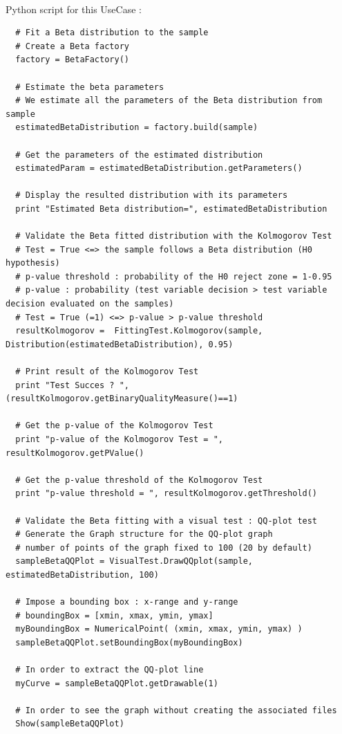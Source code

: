 \textspace\\
Python script for this UseCase :

\begin{lstlisting}
  # Fit a Beta distribution to the sample
  # Create a Beta factory
  factory = BetaFactory()

  # Estimate the beta parameters
  # We estimate all the parameters of the Beta distribution from sample
  estimatedBetaDistribution = factory.build(sample)

  # Get the parameters of the estimated distribution
  estimatedParam = estimatedBetaDistribution.getParameters()

  # Display the resulted distribution with its parameters
  print "Estimated Beta distribution=", estimatedBetaDistribution

  # Validate the Beta fitted distribution with the Kolmogorov Test
  # Test = True <=> the sample follows a Beta distribution (H0 hypothesis)
  # p-value threshold : probability of the H0 reject zone = 1-0.95
  # p-value : probability (test variable decision > test variable decision evaluated on the samples)
  # Test = True (=1) <=> p-value > p-value threshold
  resultKolmogorov =  FittingTest.Kolmogorov(sample, Distribution(estimatedBetaDistribution), 0.95)

  # Print result of the Kolmogorov Test
  print "Test Succes ? ", (resultKolmogorov.getBinaryQualityMeasure()==1)

  # Get the p-value of the Kolmogorov Test
  print "p-value of the Kolmogorov Test = ", resultKolmogorov.getPValue()

  # Get the p-value threshold of the Kolmogorov Test
  print "p-value threshold = ", resultKolmogorov.getThreshold()

  # Validate the Beta fitting with a visual test : QQ-plot test
  # Generate the Graph structure for the QQ-plot graph
  # number of points of the graph fixed to 100 (20 by default)
  sampleBetaQQPlot = VisualTest.DrawQQplot(sample, estimatedBetaDistribution, 100)

  # Impose a bounding box : x-range and y-range
  # boundingBox = [xmin, xmax, ymin, ymax]
  myBoundingBox = NumericalPoint( (xmin, xmax, ymin, ymax) )
  sampleBetaQQPlot.setBoundingBox(myBoundingBox)

  # In order to extract the QQ-plot line
  myCurve = sampleBetaQQPlot.getDrawable(1)

  # In order to see the graph without creating the associated files
  Show(sampleBetaQQPlot)


\end{lstlisting}
